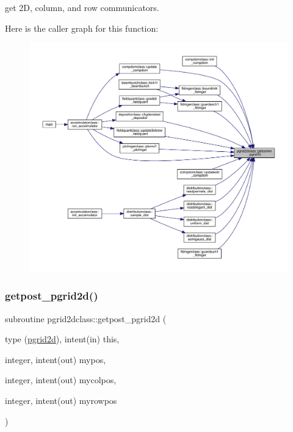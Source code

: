 get 2D, column, and row communicators. 

Here is the caller graph for this function\+:
\nopagebreak
\begin{figure}[H]
\begin{center}
\leavevmode
\includegraphics[width=350pt]{namespacepgrid2dclass_a550cb1b5c94a9e168c3e0108bb8a6d5b_icgraph}
\end{center}
\end{figure}
\mbox{\label{namespacepgrid2dclass_a559d4550356f88440ae55fceda480de2}} 
\subsubsection{\texorpdfstring{getpost\_pgrid2d()}{getpost\_pgrid2d()}}
{\footnotesize\ttfamily subroutine pgrid2dclass\+::getpost\+\_\+pgrid2d (\begin{DoxyParamCaption}\item[{type (\mbox{\hyperlink{namespacepgrid2dclass_structpgrid2dclass_1_1pgrid2d}{pgrid2d}}), intent(in)}]{this,  }\item[{integer, intent(out)}]{mypos,  }\item[{integer, intent(out)}]{mycolpos,  }\item[{integer, intent(out)}]{myrowpos }\end{DoxyParamCaption})}




